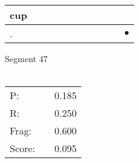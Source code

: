 \documentclass[landscape]{article}
\newcommand{\ssp}{\hspace{2pt}}
\newcommand{\mex}{\cellcolor{g}$\bullet$}
\begin{document}
\begin{tabular}{|l|p{10pt}|p{10pt}|p{10pt}|p{10pt}|p{10pt}|p{10pt}|p{10pt}|p{10pt}|p{10pt}|p{10pt}|}
\hline
\ssp cup \ssp&\hspace{2pt}&\hspace{2pt}&\hspace{2pt}&\hspace{2pt}&\hspace{2pt}&\hspace{2pt}&\hspace{2pt}&\hspace{2pt}&\hspace{2pt}&\hspace{2pt}\\
\hline
\ssp \cellcolor{ref9}. \ssp&\hspace{2pt}&\hspace{2pt}&\hspace{2pt}&\hspace{2pt}&\hspace{2pt}&\hspace{2pt}&\hspace{2pt}&\hspace{2pt}&\hspace{2pt}&\hspace{2pt}\mex\\
\hline
\end{tabular}

\vspace{6pt}
\noindent Segment 47\\\\
\noindent\begin{tabular}{lm{12pt}r}
\hline
P:&&0.185\\
R:&&0.250\\
Frag:&&0.600\\
Score:&&0.095\\
\end{tabular}

\newpage
\end{document}
